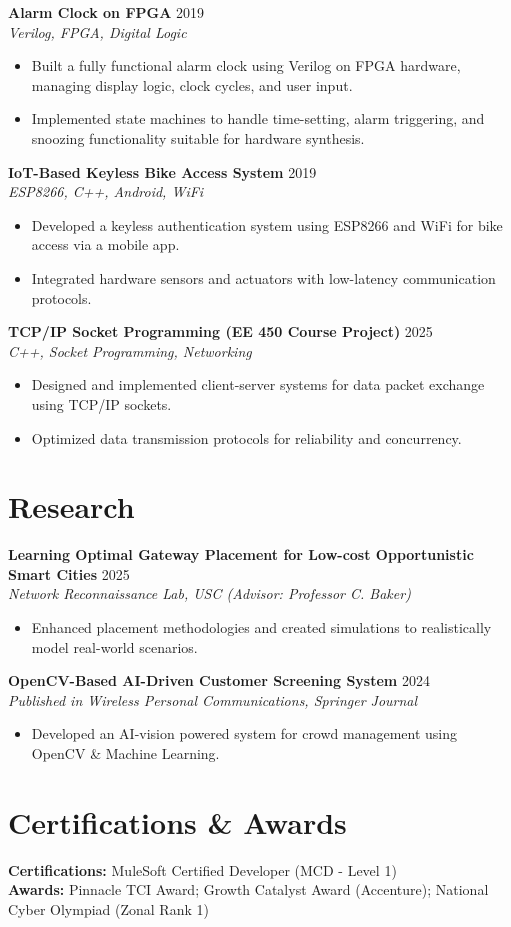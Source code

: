 \documentclass[letterpaper,10pt]{article}
\begin{document}
\textbf{Alarm Clock on FPGA} \hfill 2019 \\
\textit{Verilog, FPGA, Digital Logic}
\begin{itemize}[leftmargin=*,noitemsep,topsep=-2pt]
    \item Built a fully functional alarm clock using Verilog on FPGA hardware, managing display logic, clock cycles, and user input.
    \item Implemented state machines to handle time-setting, alarm triggering, and snoozing functionality suitable for hardware synthesis.
\end{itemize}

\textbf{IoT-Based Keyless Bike Access System} \hfill 2019 \\
\textit{ESP8266, C++, Android, WiFi}
\begin{itemize}[leftmargin=*,noitemsep,topsep=-2pt]
    \item Developed a keyless authentication system using ESP8266 and WiFi for bike access via a mobile app.
    \item Integrated hardware sensors and actuators with low-latency communication protocols.
\end{itemize}

\textbf{TCP/IP Socket Programming (EE 450 Course Project)} \hfill 2025 \\
\textit{C++, Socket Programming, Networking}
\begin{itemize}[leftmargin=*,noitemsep,topsep=-2pt]
    \item Designed and implemented client-server systems for data packet exchange using TCP/IP sockets.
    \item Optimized data transmission protocols for reliability and concurrency.
\end{itemize}

\section*{Research}

\textbf{Learning Optimal Gateway Placement for Low-cost Opportunistic Smart Cities} \hfill 2025 \\
\textit{Network Reconnaissance Lab, USC (Advisor: Professor C. Baker)}
\begin{itemize}[leftmargin=*,noitemsep,topsep=-2pt]
    \item Enhanced placement methodologies and created simulations to realistically model real-world scenarios.
\end{itemize}
\textbf{OpenCV-Based AI-Driven Customer Screening System} \hfill 2024 \\
\textit{Published in Wireless Personal Communications, Springer Journal}
\begin{itemize}[leftmargin=*,noitemsep,topsep=-2pt]
    \item Developed an AI-vision powered system for crowd management using OpenCV \& Machine Learning.
\end{itemize}

\section*{Certifications \& Awards}
\textbf{Certifications:} MuleSoft Certified Developer (MCD - Level 1) \\
\textbf{Awards:} Pinnacle TCI Award; Growth Catalyst Award (Accenture); National Cyber Olympiad (Zonal Rank 1)
\end{document}
